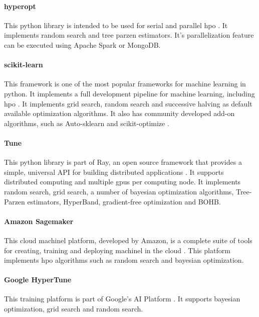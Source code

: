 \paragraph{hyperopt} This \acrshort{python} library is intended to be used for serial and parallel \acrshort{hpo} \parencite{hyperopt}. It implements random search and tree parzen estimators. It's parallelization feature can be executed using Apache Spark or MongoDB.

\paragraph{scikit-learn} This framework is one of the most popular frameworks for machine learning in \acrshort{python}. It implements a full development pipeline for machine learning, including \acrshort{hpo} \parencite{scikit-learn}. It implements grid search, random search and successive halving as default available optimization algorithms. It also has community developed add-on algorithms, such as Auto-sklearn \parencite{auto-sklearn} and scikit-optimize \parencite{scikit-optimize}.

\paragraph{Tune} This \acrshort{python} library is part of Ray, an open source framework that provides a simple, universal API for building distributed applications \parencite{ray}. It supports distributed computing and multiple \acrshort{gpu}s per computing node. It implements random search, grid search, a number of bayesian optimization algorithms, Tree-Parzen estimators, HyperBand, gradient-free optimization and BOHB.

\paragraph{Amazon Sagemaker} This cloud \acrshort{machinel} platform, developed by Amazon, is a complete suite of tools for creating, training and deploying \acrshort{machinel} in the cloud \parencite{sagemaker}. This platform implements \acrshort{hpo} algorithms such as random search and bayesian optimization.

\paragraph{Google HyperTune} This training platform is part of Google's AI Platform \parencite{ghypertune}. It supports bayesian optimization, grid search and random search.   

